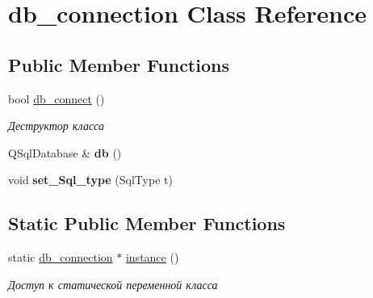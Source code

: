 \hypertarget{classdb__connection}{}\section{db\+\_\+connection Class Reference}
\label{classdb__connection}
\subsection*{Public Member Functions}
\begin{DoxyCompactItemize}
\item 
\mbox{\label{classdb__connection_ae408ae39fbd53496880729dcb7d80b61}} 
bool \mbox{\hyperlink{classdb__connection_ae408ae39fbd53496880729dcb7d80b61}{db\+\_\+connect}} ()
\begin{DoxyCompactList}\small\item\em Деструктор класса \end{DoxyCompactList}\item 
\mbox{\label{classdb__connection_a8cf97168a30c9bc1d12ffac565943dde}} 
Q\+Sql\+Database \& {\bfseries db} ()
\item 
\mbox{\label{classdb__connection_a9197fef698bc0d64070bee2afa306b2d}} 
void {\bfseries set\+\_\+\+Sql\+\_\+type} (Sql\+Type t)
\end{DoxyCompactItemize}
\subsection*{Static Public Member Functions}
\begin{DoxyCompactItemize}
\item 
\mbox{\label{classdb__connection_af3dfe3178795ed64ea06721733a07a8a}} 
static \mbox{\hyperlink{classdb__connection}{db\+\_\+connection}} $\ast$ \mbox{\hyperlink{classdb__connection_af3dfe3178795ed64ea06721733a07a8a}{instance}} ()
\begin{DoxyCompactList}\small\item\em Доступ к статической переменной класса \end{DoxyCompactList}\end{DoxyCompactItemize}
